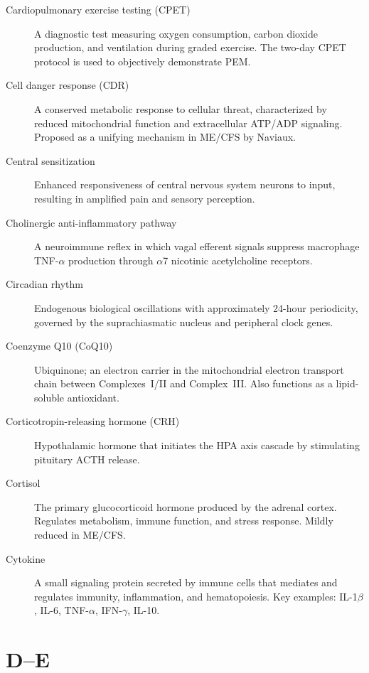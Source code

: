 \begin{description}
\item[Cardiopulmonary exercise testing (CPET)] A diagnostic test measuring oxygen consumption, carbon dioxide production, and ventilation during graded exercise. The two-day CPET protocol is used to objectively demonstrate PEM.
\item[Cell danger response (CDR)] A conserved metabolic response to cellular threat, characterized by reduced mitochondrial function and extracellular ATP/ADP signaling. Proposed as a unifying mechanism in ME/CFS by Naviaux.
\item[Central sensitization] Enhanced responsiveness of central nervous system neurons to input, resulting in amplified pain and sensory perception.
\item[Cholinergic anti-inflammatory pathway] A neuroimmune reflex in which vagal efferent signals suppress macrophage TNF-$\alpha$ production through $\alpha$7 nicotinic acetylcholine receptors.
\item[Circadian rhythm] Endogenous biological oscillations with approximately 24-hour periodicity, governed by the suprachiasmatic nucleus and peripheral clock genes.
\item[Coenzyme Q10 (CoQ10)] Ubiquinone; an electron carrier in the mitochondrial electron transport chain between Complexes~I/II and Complex~III. Also functions as a lipid-soluble antioxidant.
\item[Corticotropin-releasing hormone (CRH)] Hypothalamic hormone that initiates the HPA axis cascade by stimulating pituitary ACTH release.
\item[Cortisol] The primary glucocorticoid hormone produced by the adrenal cortex. Regulates metabolism, immune function, and stress response. Mildly reduced in ME/CFS.
\item[Cytokine] A small signaling protein secreted by immune cells that mediates and regulates immunity, inflammation, and hematopoiesis. Key examples: IL-1$\beta$, IL-6, TNF-$\alpha$, IFN-$\gamma$, IL-10.
\end{description}

\section*{D--E}

